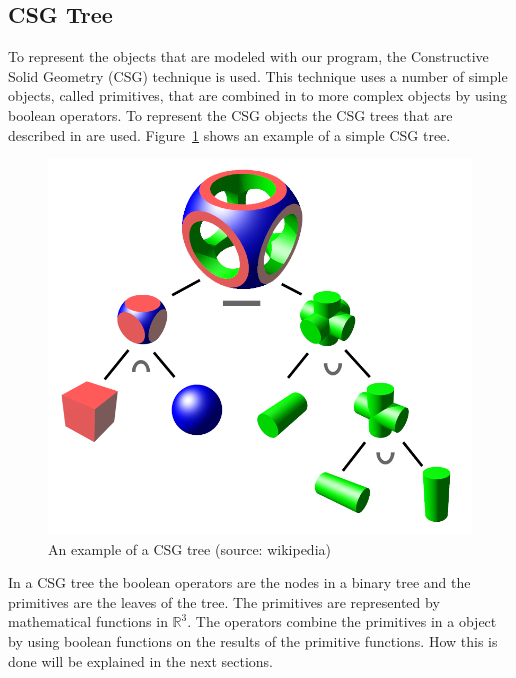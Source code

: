 \documentclass[a4paper,10pt,twocolumn]{article}
\begin{document}
    
\subsection{CSG Tree}
    To represent the objects that are modeled with our program, the Constructive Solid Geometry (CSG) technique is used. This technique uses a number of simple objects, called primitives, that are combined in to more complex objects by using boolean operators. To represent the CSG objects the CSG trees that are described in \cite{Wiegand96} are used. Figure~\ref{figure:csg_tree} shows an example of a simple CSG tree.

    \begin{figure}[h]
        \begin{center}
            \includegraphics[scale=.2]{./images/csgtree.png}
        \end{center}
        \caption{An example of a CSG tree (source: wikipedia\cite{img:wiki_csg_tree})}
        \label{figure:csg_tree}
    \end{figure}

    In a CSG tree the boolean operators are the nodes in a binary tree and the primitives are the leaves of the tree. The primitives are represented by mathematical functions in $\mathbb{R}^3$. The operators combine the primitives in a object by using boolean functions on the results of the primitive functions. How this is done will be explained in the next sections.
\end{document}
